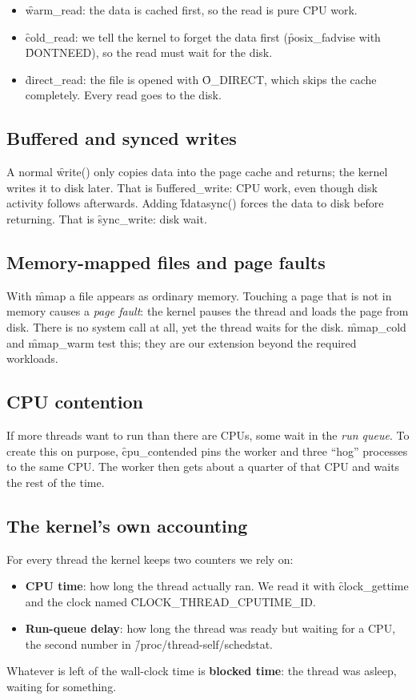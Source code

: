 \documentclass[11pt]{article}
\begin{document}
\begin{itemize}
\item \f{warm\_read}: the data is cached first, so the read is pure CPU work.
\item \f{cold\_read}: we tell the kernel to forget the data first (\f{posix\_fadvise} with \f{DONTNEED}), so the read must wait for the disk.
\item \f{direct\_read}: the file is opened with \f{O\_DIRECT}, which skips the cache completely. Every read goes to the disk.
\end{itemize}

\subsection{Buffered and synced writes}
A normal \f{write()} only copies data into the page cache and returns; the kernel writes it to disk later. That is \f{buffered\_write}: CPU work, even though disk activity follows afterwards. Adding \f{fdatasync()} forces the data to disk before returning. That is \f{sync\_write}: disk wait.

\subsection{Memory-mapped files and page faults}
With \f{mmap} a file appears as ordinary memory. Touching a page that is not in memory causes a \emph{page fault}: the kernel pauses the thread and loads the page from disk. There is no system call at all, yet the thread waits for the disk. \f{mmap\_cold} and \f{mmap\_warm} test this; they are our extension beyond the required workloads.

\subsection{CPU contention}
If more threads want to run than there are CPUs, some wait in the \emph{run queue}. To create this on purpose, \f{cpu\_contended} pins the worker and three ``hog'' processes to the same CPU. The worker then gets about a quarter of that CPU and waits the rest of the time.

\subsection{The kernel's own accounting}
For every thread the kernel keeps two counters we rely on:
\begin{itemize}
\item \textbf{CPU time}: how long the thread actually ran. We read it with \f{clock\_gettime} and the clock named \f{CLOCK\_THREAD\_CPUTIME\_ID}.
\item \textbf{Run-queue delay}: how long the thread was ready but waiting for a CPU, the second number in \f{/proc/thread-self/schedstat}.
\end{itemize}
Whatever is left of the wall-clock time is \textbf{blocked time}: the thread was asleep, waiting for something.
\end{document}

